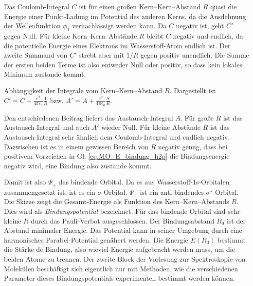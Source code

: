 Das Coulomb-Integral $C$ ist für einen  großen Kern--Kern--Abstand $R$ quasi die Energie einer Punkt-Ladung im Potential des anderen Kerns, da die Ausdehnung der Wellenfunktion $\phi_1$ vernachlässigt werden kann. Da $C$ negativ ist, geht $C'$ gegen Null. Für kleine Kern--Kern--Abstände $R$ bleibt $C$ negativ und endlich, da die potentielle Energie eines Elektrons im Wasserstoff-Atom endlich ist. Der zweite Summand von  $C'$ strebt aber mit $1/R$ gegen positiv unendlich. Die Summe der ersten beiden Terme ist also entweder Null oder positiv, so dass kein lokales Minimum zustande kommt.



\begin{marginfigure}

\caption{Abhängigkeit der Integrale vom Kern--Kern--Abstand $R$. Dargestellt ist 
$C' = C  + \frac{e^2}{4 \pi \epsilon_0} \frac{1 }{R}$ bzw. $A' = A   + \frac{e^2}{4 \pi \epsilon_0} \frac{ S }{R}$. \label{fig:MO_H2_integrale_r}
 }
\end{marginfigure}



Den entschiedenen Beitrag liefert das Austausch-Integral $A$. Für große $R$ ist das Austausch-Integral und auch $A'$ wieder Null. Für kleine Abstände $R$ ist das Austausch-Integral sehr ähnlich dem Coulomb-Integral und endlich negativ. Dazwischen ist es in einem gewissen Bereich von $R$ negativ genug, dass bei positivem Vorzeichen in Gl. \ref{eq:MO_E_bindung_h2p} die Bindungsenergie negativ wird, eine Bindung also zustande kommt.

Damit ist also $\Psi_+$ das bindende Orbital. Da es aus Wasserstoff-1s-Orbitalen zusammengesetzt ist, ist es ein $\sigma$-Orbital. $\Psi_-$ ist ein anti-bindendes $\sigma^\star$-Orbital. Die Skizze zeigt die Gesamt-Energie als Funktion des Kern--Kern--Abstands $R$. Dies wird als \emph{Bindungspotential} bezeichnet. Für das bindende Orbital sind sehr kleine $R$ durch das Pauli-Verbot ausgeschlossen.
Der Bindungsabstand $R_0$ ist der Abstand minimaler Energie. Das Potential kann in seiner Umgebung durch eine harmonisches Parabel-Potential genähert werden. Die Energie $E(R_0)$ bestimmt die Stärke de Bindung, also wieviel Energie aufgebracht werden muss, um die beiden Atome zu trennen. Der zweite Block der Vorlesung zur Spektroskopie von Molekülen beschäftigt sich eigentlich nur mit Methoden, wie die verschiedenen Parameter dieses Bindungspotentials experimentell bestimmt werden können.



